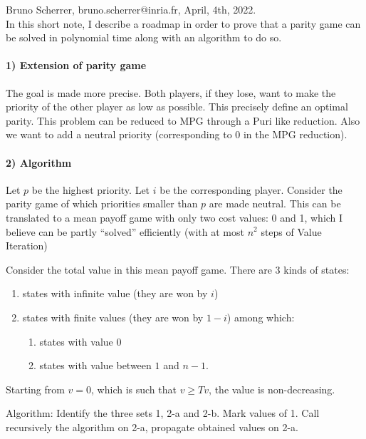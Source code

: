 \documentclass{article}
\begin{document}
Bruno Scherrer, bruno.scherrer@inria.fr, April, 4th, 2022.
~\\

In this short note, I describe a roadmap in order to prove that a parity game can be solved in polynomial time along with an algorithm to do so.


\paragraph{1) Extension of parity game}

The goal is made more precise. Both players, if they lose, want to make the priority of the other player as low as possible. 
This precisely define an optimal parity. This problem can be reduced to MPG through a Puri like reduction.
Also we want to add a neutral priority (corresponding to 0 in the MPG reduction).

\paragraph{2) Algorithm}

Let $p$ be the highest priority. Let $i$ be the corresponding player. Consider the parity game of which priorities smaller than $p$ are made neutral.
This can be translated to a mean payoff game with only two cost values: 0 and 1, which I believe can be partly ``solved'' efficiently (with at most $n^2$ steps of Value Iteration)

Consider the total value in this mean payoff game. There are 3 kinds of states:
\begin{enumerate}
  \item states with infinite value (they are won by $i$)
\item states with finite values (they are won by $1-i$) among which:
  \begin{enumerate}
  \item states with value $0$
  \item states with value between $1$ and $n-1$.
  \end{enumerate}
\end{enumerate}
Starting from $v=0$, which is such that $v \ge Tv$, the value is non-decreasing.


Algorithm: Identify the three sets 1, 2-a and 2-b. Mark values of 1. Call recursively the algorithm on 2-a, propagate obtained values on 2-a. 
\end{document}
